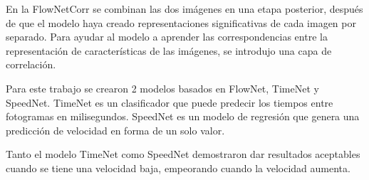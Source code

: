 En la FlowNetCorr se combinan las dos imágenes en una etapa posterior, después de que el modelo haya creado representaciones significativas de cada imagen por separado. Para ayudar al modelo a aprender las correspondencias entre la representación de características de las imágenes, se introdujo una capa de correlación.

Para este trabajo se crearon 2 modelos basados en FlowNet, TimeNet y SpeedNet. TimeNet es un clasificador que puede predecir los tiempos entre fotogramas en milisegundos. SpeedNet es un modelo de regresión que genera una predicción de velocidad en forma de un solo valor.

Tanto el modelo TimeNet como SpeedNet demostraron dar resultados aceptables cuando se tiene una velocidad baja, empeorando cuando la velocidad aumenta.
